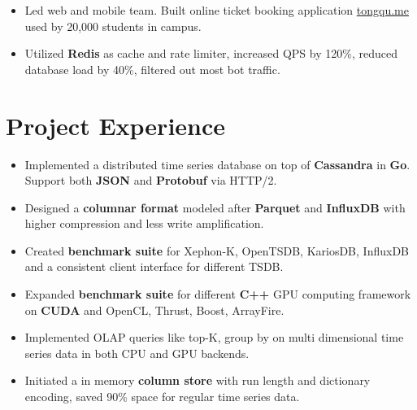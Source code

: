 \documentclass[11pt, letterpaper]{simple-cv}
\begin{document}
\begin{itemize}
  \item Led web and mobile team. Built online ticket booking application \href{https://tongqu.me}{tongqu.me} used by 20,000 students in campus.
  \item Utilized \textbf{Redis} as cache and rate limiter, increased QPS by 120\%, reduced database load by 40\%, filtered out most bot traffic.
\end{itemize}

\section{Project Experience}



\begin{itemize}
  \item Implemented a distributed time series database on top of \textbf{Cassandra} in \textbf{Go}. Support both \textbf{JSON} and \textbf{Protobuf} via HTTP/2.
  \item Designed a \textbf{columnar format} modeled after \textbf{Parquet} and \textbf{InfluxDB} with higher compression and less write amplification.
  \item Created \textbf{benchmark suite} for Xephon-K, OpenTSDB, KariosDB, InfluxDB and a consistent client interface for different TSDB.
\end{itemize}


\begin{itemize}
  \item Expanded \textbf{benchmark suite} for different \textbf{C++} GPU computing framework on \textbf{CUDA} and OpenCL, Thrust, Boost, ArrayFire.
  \item Implemented OLAP queries like top-K, group by on multi dimensional time series data in both CPU and GPU backends.
  \item Initiated a in memory \textbf{column store} with run length and dictionary encoding, saved 90\% space for regular time series data.
\end{itemize}
\end{document}
